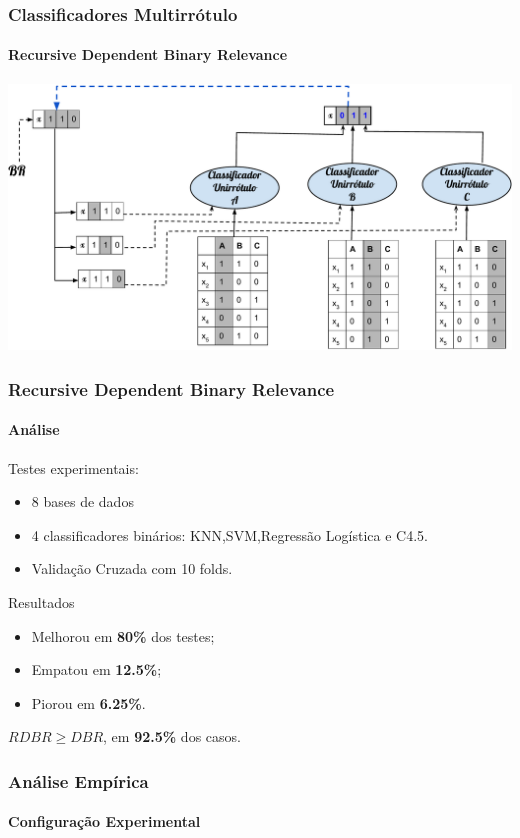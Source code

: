 \documentclass[10pt,fleqn]{beamer}
\begin{document}
\begin{frame}
  \frametitle{Classificadores Multirrótulo}
  \framesubtitle{Recursive Dependent Binary Relevance}
    \begin{center}
  \includegraphics[scale=0.4]{RDBR-fig}
    \end{center}
\end{frame}

\begin{frame}
  \frametitle{Recursive Dependent Binary Relevance}
  \framesubtitle{Análise}
    
    Testes experimentais:
    \begin{itemize}
     \item 8 bases de dados
     \item 4 classificadores binários: KNN,SVM,Regressão Logística e C4.5.
     \item Validação Cruzada com 10 folds.
    \end{itemize}
    
    \begin{block}{Resultados}
     \begin{itemize}
      \item Melhorou em \textbf{80\%} dos testes;
      \item Empatou em \textbf{12.5\%};
      \item Piorou em \textbf{6.25\%}.
     \end{itemize}
    \end{block}
   \begin{center}
  $RDBR\geq DBR$, em \textbf{92.5\%} dos casos.
  \end{center}
\end{frame}

\begin{frame}
  \frametitle{Análise Empírica}
  \framesubtitle{Configuração Experimental}
  
    
\end{frame}  
\end{document}
